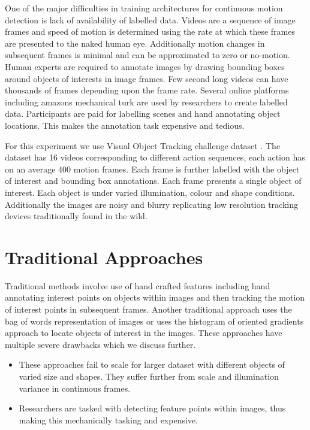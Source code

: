 \documentclass[sigconf]{acmart}
\begin{document}
One of the major difficulties in training architectures for continuous motion detection is lack of availability of labelled data. Videos are a sequence of image frames and speed of motion is determined using the rate at which these frames are presented to the naked human eye. Additionally motion changes in subsequent frames is minimal and can be approximated to zero or no-motion. Human experts are required to annotate images by drawing bounding boxes around objects of interests in image frames. Few second long videos can have thousands of frames depending upon the frame rate. Several online platforms including amazons mechanical turk are used by researchers to create labelled data. Participants are paid for labelling scenes and hand annotating object locations. This makes the annotation task expensive and tedious. 

For this experiment we use Visual Object Tracking challenge dataset \cite{6755885}. The dataset has 16 videos corresponding to different action sequences, each action has on an average 400 motion frames. Each frame is further labelled with the object of interest and bounding box annotations. Each frame presents a single object of interest. Each object is under varied illumination, colour and shape conditions. Additionally the images are noisy and blurry replicating low resolution tracking devices traditionally found in the wild.  


\section{Traditional Approaches} \label{traditional}

Traditional methods involve use of hand crafted features including hand annotating interest points on objects within images and then tracking the motion of interest points in subsequent frames. Another traditional approach uses the bag of words representation of images or uses the histogram of oriented gradients \cite{articlezhou} approach to locate objects of interest in the images. These approaches have multiple severe drawbacks which we discuss further. 

\begin{itemize}
\setlength\itemsep{1em}
\item These approaches fail to scale for larger dataset with different objects of varied size and shapes. They suffer further from scale and illumination variance in continuous frames.

\item Researchers are tasked with detecting feature points within images, thus making this mechanically tasking and expensive.
\end{itemize}
\end{document}
